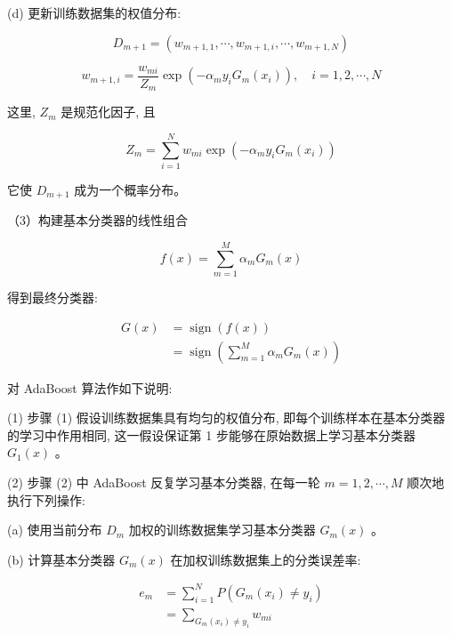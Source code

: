 \documentclass[10pt]{article}
\begin{document}
(d) 更新训练数据集的权值分布:


\begin{equation*}
D_{m+1}=\left(w_{m+1,1}, \cdots, w_{m+1, i}, \cdots, w_{m+1, N}\right) \tag{8.3}
\end{equation*}



\begin{equation*}
w_{m+1, i}=\frac{w_{m i}}{Z_{m}} \exp \left(-\alpha_{m} y_{i} G_{m}\left(x_{i}\right)\right), \quad i=1,2, \cdots, N \tag{8.4}
\end{equation*}


这里, $Z_{m}$ 是规范化因子, 且


\begin{equation*}
Z_{m}=\sum_{i=1}^{N} w_{m i} \exp \left(-\alpha_{m} y_{i} G_{m}\left(x_{i}\right)\right) \tag{8.5}
\end{equation*}


它使 $D_{m+1}$ 成为一个概率分布。

（3）构建基本分类器的线性组合


\begin{equation*}
f(x)=\sum_{m=1}^{M} \alpha_{m} G_{m}(x) \tag{8.6}
\end{equation*}


得到最终分类器:


\begin{align*}
G(x) & =\operatorname{sign}(f(x)) \\
& =\operatorname{sign}\left(\sum_{m=1}^{M} \alpha_{m} G_{m}(x)\right) \tag{8.7}
\end{align*}


对 AdaBoost 算法作如下说明:

(1) 步骤 (1) 假设训练数据集具有均匀的权值分布, 即每个训练样本在基本分类器的学习中作用相同, 这一假设保证第 1 步能够在原始数据上学习基本分类器 $G_{1}(x)$ 。

(2) 步骤 (2) 中 AdaBoost 反复学习基本分类器, 在每一轮 $m=1,2, \cdots, M$ 顺次地执行下列操作:

(a) 使用当前分布 $D_{m}$ 加权的训练数据集学习基本分类器 $G_{m}(x)$ 。

(b) 计算基本分类器 $G_{m}(x)$ 在加权训练数据集上的分类误差率:


\begin{align*}
e_{m} & =\sum_{i=1}^{N} P\left(G_{m}\left(x_{i}\right) \neq y_{i}\right) \\
& =\sum_{G_{m}\left(x_{i}\right) \neq y_{i}} w_{m i} \tag{8.8}
\end{align*}
\end{document}

